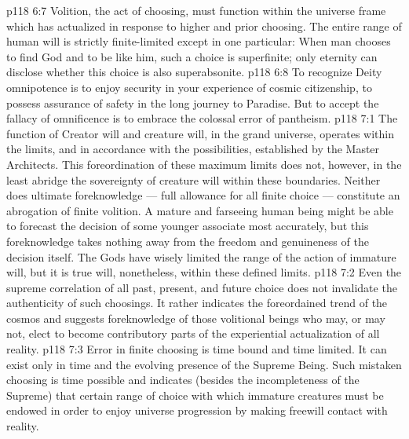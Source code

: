 \vs p118 6:7 Volition, the act of choosing, must function within the universe frame which has actualized in response to higher and prior choosing. The entire range of human will is strictly finite\hyp{}limited except in one particular: When man chooses to find God and to be like him, such a choice is superfinite; only eternity can disclose whether this choice is also superabsonite.
\vs p118 6:8 \pc To recognize Deity omnipotence is to enjoy security in your experience of cosmic citizenship, to possess assurance of safety in the long journey to Paradise. But to accept the fallacy of omnificence is to embrace the colossal error of pantheism.
\vs p118 7:1 The function of Creator will and creature will, in the grand universe, operates within the limits, and in accordance with the possibilities, established by the Master Architects. This foreordination of these maximum limits does not, however, in the least abridge the sovereignty of creature will within these boundaries. Neither does ultimate foreknowledge --- full allowance for all finite choice --- constitute an abrogation of finite volition. A mature and farseeing human being might be able to forecast the decision of some younger associate most accurately, but this foreknowledge takes nothing away from the freedom and genuineness of the decision itself. The Gods have wisely limited the range of the action of immature will, but it is true will, nonetheless, within these defined limits.
\vs p118 7:2 Even the supreme correlation of all past, present, and future choice does not invalidate the authenticity of such choosings. It rather indicates the foreordained trend of the cosmos and suggests foreknowledge of those volitional beings who may, or may not, elect to become contributory parts of the experiential actualization of all reality.
\vs p118 7:3 \pc Error in finite choosing is time bound and time limited. It can exist only in time and  the evolving presence of the Supreme Being. Such mistaken choosing is time possible and indicates (besides the incompleteness of the Supreme) that certain range of choice with which immature creatures must be endowed in order to enjoy universe progression by making freewill contact with reality.
